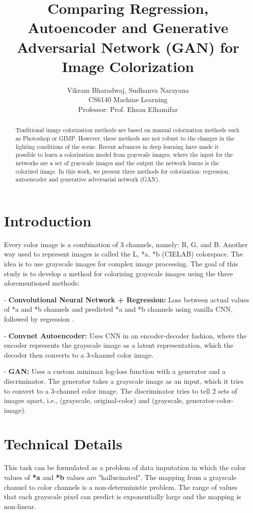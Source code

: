 \documentclass{article}
\title{Comparing Regression, Autoencoder and Generative
Adversarial Network (GAN) for Image Colorization}
\author{Vikram Bharadwaj, Sudhanva Narayana \\ 
        CS6140 Machine Learning \\
        Professor: Prof. Ehsan Elhamifar \\}
\begin{document}
\maketitle

\begin{abstract}
Traditional image colorization methods are based on manual colorization methods such as Photoshop or GIMP.
However, these methods are not robust to the changes in the lighting conditions of the scene.
Recent advances in deep learning have made it possible to learn a colorization model from grayscale images, where the input for the networks are a set of grayscale images and the output the network learns is the colorized image. 
In this work, we present three methods for colorization: regression, autoencoder and generative adversarial network (GAN).
\end{abstract}

\section{Introduction}
Every color image is a combination of 3 channels, namely: R, G, and B. 
Another way used to represent images is called the L, *a, *b (CIELAB) colorspace.
The idea is to use grayscale images for complex image processing. 
The goal of this study is to develop a method for colorizing grayscale images using the three aforementioned methods:

- \textbf{Convolutional Neural Network + Regression:} Loss between actual values of *a and *b channels and predicted *a and *b channels using vanilla CNN, followed by regression \cite{1}.

- \textbf{Convnet Autoencoder:} Uses CNN in an encoder-decoder fashion, where the encoder represents the grayscale image as a latent representation, which the decoder then converts to a 3-channel color image.

- \textbf{GAN:}  Uses a custom minimax log-loss function with a generator and a discriminator. The generator takes a grayscale image as an input, which it tries to convert to a 3-channel color image. The discriminator tries to tell 2 sets of images apart, i.e., (grayscale, original-color) and (grayscale, generator-color-image).

\section{Technical Details}
This task can be formulated as a problem of data imputation in which the color values of \textbf{*a} and \textbf{*b} values are "hallucinated".
The mapping from a grayscale channel to color channels is a non-deterministic problem. 
The range of values that each grayscale pixel can predict is exponentially large and the mapping is non-linear. 
\end{document}
